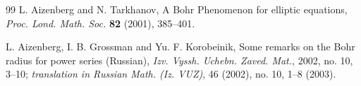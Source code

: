 \documentclass[a4paper,12pt]{amsart}
\theoremstyle{definition}
\begin{document}
\begin{thebibliography}{99}
	 {\sc L. Aizenberg}  and {\sc N. Tarkhanov}, A Bohr Phenomenon for elliptic equations, 
	{\it Proc. Lond. Math. Soc.} {\bf  82} (2001), 385--401.
	
	 {\sc L. Aizenberg, I. B. Grossman}  and {\sc Yu. F. Korobeinik}, Some remarks on the Bohr radius	for power series (Russian), {\it Izv. Vyssh. Uchebn. Zaved. Mat.}, 2002, no. 10, 3–10; {\it translation	in Russian Math. (Iz. VUZ)}, 46 (2002), no. 10, 1–8 (2003).
	
	
	
	
	
	
	
	
	
	
	

\end{thebibliography}
\end{document}
